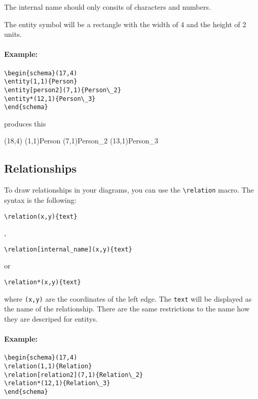 \documentclass[a4paper,11pt]{article}
\begin{document}
The internal name should only consits of characters and numbers.

The entity symbol will be a rectangle with the width of 4 and the height of 2 
units.

\paragraph{Example:}
\begin{verbatim}
\begin{schema}(17,4)
\entity(1,1){Person}
\entity[person2](7,1){Person\_2}
\entity*(12,1){Person\_3}
\end{schema}
\end{verbatim}

produces this

\begin{schema}(18,4)
\entity(1,1){Person}
\entity[person2](7,1){Person\_2}
\entity*(13,1){Person\_3}
\end{schema}

\subsection{Relationships}

To draw relationships in your diagrams, you can use the \verb|\relation| macro.
The syntax is the following:

\begin{verbatim}
\relation(x,y){text}
\end{verbatim}

,

\begin{verbatim}
\relation[internal_name](x,y){text}
\end{verbatim}

or

\begin{verbatim}
\relation*(x,y){text}
\end{verbatim}

where {\tt (x,y)} are the coordinates of the left edge. The {\tt text} will be displayed as 
the name of the relationship. There are the same restrictions to the name 
how they are descriped for entitys.

\paragraph{Example:}

\begin{verbatim}
\begin{schema}(17,4)
\relation(1,1){Relation}
\relation[relation2](7,1){Relation\_2}
\relation*(12,1){Relation\_3}
\end{schema}
\end{verbatim}
\end{document}
